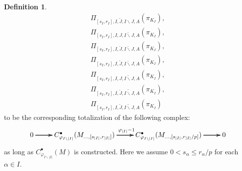 \documentclass[12pt]{amsart}
\theoremstyle{definition}
\newtheorem{definition}[theorem]{Definition}
\numberwithin{equation}{section}
\begin{document}
\begin{definition}
\begin{align}
\Pi_{[s_I,r_I],I,\widetilde{J},I\backslash J,A}(\pi_{K_I}),\\
\Pi_{[s_I,r_I],I,J,\breve{I\backslash J},A}(\pi_{K_I}),\\	
\Pi_{[s_I,r_I],I,\breve{J},\breve{I\backslash J},A}(\pi_{K_I}),\\
\Pi_{[s_I,r_I],I,\widetilde{J},\breve{I\backslash J},A}(\pi_{K_I}),\\
\Pi_{[s_I,r_I],I,J,\widetilde{I\backslash J},A}(\pi_{K_I}),\\	
\Pi_{[s_I,r_I],I,\breve{J},\widetilde{I\backslash J},A}(\pi_{K_I}),\\
\Pi_{[s_I,r_I],I,\widetilde{J},\widetilde{I\backslash J},A}(\pi_{K_I})	
\end{align}	
to be the corresponding totalization of the following complex:
\[
\xymatrix@C+0pc@R+0pc{
0 \ar[r] \ar[r] \ar[r] &C^\bullet_{\varphi_{I\backslash |I|}}(M_{...,[s_{|I|},r_{|I|}]}) \ar[r]^{\varphi_{|I|}-1}\ar[r]\ar[r] &C^\bullet_{\varphi_{I\backslash |I|}}(M_{...,[s_{|I|},r_{|I|}/p]}) \ar[r] \ar[r] \ar[r] &0
}
\]
as long as $C^\bullet_{\varphi_{I\backslash |I|}}(M)$ is constructed. Here we assume $0< s_\alpha \leq r_\alpha/p$ for each $\alpha\in I$.	
\end{definition}
\end{document}

